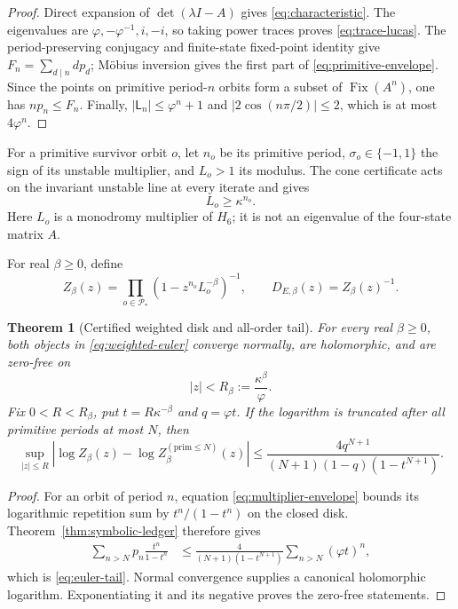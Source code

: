 \documentclass[11pt]{article}
\numberwithin{equation}{section}
\newtheorem{theorem}{Theorem}[section]
\theoremstyle{remark}
\newcommand{\Fix}{\operatorname{Fix}}
\newcommand{\cP}{\mathcal P}
\begin{document}
\begin{proof}
Direct expansion of \(\det(\lambda I-A)\) gives
\eqref{eq:characteristic}.  The eigenvalues are
\(
\varphi,-\varphi^{-1},i,-i
\), so taking power traces proves \eqref{eq:trace-lucas}.  The
period-preserving conjugacy and finite-state fixed-point identity give
\(
F_n=\sum_{d\mid n}d p_d
\); M\"obius inversion gives the first part of
\eqref{eq:primitive-envelope}.  Since the points on primitive period-\(n\)
orbits form a subset of \(\Fix(A^n)\), one has \(np_n\le F_n\).  Finally,
\(
|\mathsf L_n|\le\varphi^n+1
\)
and \(|2\cos(n\pi/2)|\le2\), which is at most \(4\varphi^n\).
\end{proof}

For a primitive survivor orbit \(o\), let \(n_o\) be its primitive period,
\(\sigma_o\in\{-1,1\}\) the sign of its unstable multiplier, and
\(L_o>1\) its modulus.  The cone certificate acts on the invariant unstable
line at every iterate and gives
\begin{equation}
 L_o\ge\kappa^{n_o}.
 \label{eq:multiplier-envelope}
\end{equation}
Here \(L_o\) is a monodromy multiplier of \(H_6\); it is not an eigenvalue of
the four-state matrix \(A\).

For real \(\beta\ge0\), define
\begin{equation}
 Z_\beta(z)=\prod_{o\in\cP_*}
 (1-z^{n_o}L_o^{-\beta})^{-1},
 \qquad
 D_{E,\beta}(z)=Z_\beta(z)^{-1}.
 \label{eq:weighted-euler}
\end{equation}

\begin{theorem}[Certified weighted disk and all-order tail]
\label{thm:weighted-disk}
For every real \(\beta\ge0\), both objects in
\eqref{eq:weighted-euler} converge normally, are holomorphic, and are
zero-free on
\begin{equation}
 |z|<R_\beta:=\frac{\kappa^\beta}{\varphi}.
 \label{eq:weighted-radius}
\end{equation}
Fix \(0<R<R_\beta\), put
\(
t=R\kappa^{-\beta}
\)
and \(q=\varphi t\).  If the logarithm is truncated after all primitive
periods at most \(N\), then
\begin{equation}
 \sup_{|z|\le R}
 \left|\log Z_\beta(z)-\log Z_\beta^{(\mathrm{prim}\le N)}(z)\right|
 \le
 \frac{4q^{N+1}}
 {(N+1)(1-q)(1-t^{N+1})}.
 \label{eq:euler-tail}
\end{equation}
\end{theorem}

\begin{proof}
For an orbit of period \(n\), equation \eqref{eq:multiplier-envelope}
bounds its logarithmic repetition sum by
\(
t^n/(1-t^n)
\)
on the closed disk.  Theorem~\ref{thm:symbolic-ledger} therefore gives
\begin{align*}
 \sum_{n>N}p_n\frac{t^n}{1-t^n}
 &\le
 \frac{4}{(N+1)(1-t^{N+1})}
 \sum_{n>N}(\varphi t)^n,
\end{align*}
which is \eqref{eq:euler-tail}.  Normal convergence supplies a canonical
holomorphic logarithm.  Exponentiating it and its negative proves the
zero-free statements.
\end{proof}
\end{document}
